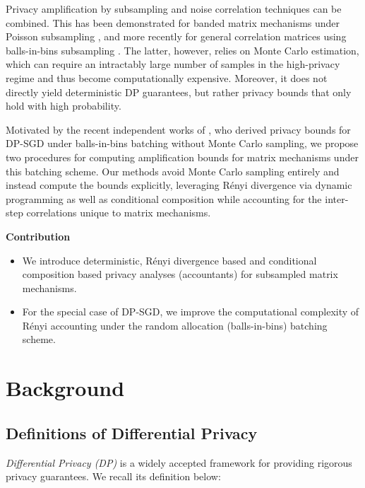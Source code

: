 \documentclass{article}
\theoremstyle{plain}
\theoremstyle{definition}
\theoremstyle{remark}
\begin{document}
Privacy amplification by subsampling and noise correlation techniques can be combined. This has been demonstrated for banded matrix mechanisms under Poisson subsampling \citep{choquette-choo2023amplified, choquette2023privacy}, and more recently for general correlation matrices using balls-in-bins subsampling \citep{choquette2024near}. The latter, however, relies on Monte Carlo estimation, which can require an intractably large number of samples in the high-privacy regime and thus become computationally expensive. Moreover, it does not directly yield deterministic DP guarantees, but rather privacy bounds that only hold with high probability.


Motivated by the recent independent works of \citet{feldman2025privacy,dong2025leveraging}, who derived privacy bounds for DP-SGD under balls-in-bins batching without Monte Carlo sampling, we propose two procedures for computing amplification bounds for matrix mechanisms under this batching scheme. Our methods avoid Monte Carlo sampling entirely and instead compute the bounds explicitly, leveraging R\'enyi divergence via dynamic programming
as well as conditional composition while accounting for the inter-step correlations unique to matrix mechanisms.


\textbf{Contribution}
\begin{itemize}[nosep]
    \item We introduce deterministic, Rényi divergence based and conditional composition based privacy analyses (accountants) for subsampled matrix mechanisms.
    \item For the special case of DP-SGD, we improve the computational complexity of R\'enyi accounting under the random allocation (balls-in-bins) batching scheme.
\end{itemize}


\section{Background}

\subsection{Definitions of Differential Privacy}\label{section:privacy_definitions}

\textit{Differential Privacy (DP)}  is a widely accepted framework for providing rigorous privacy guarantees. We recall its definition below:
\end{document}
